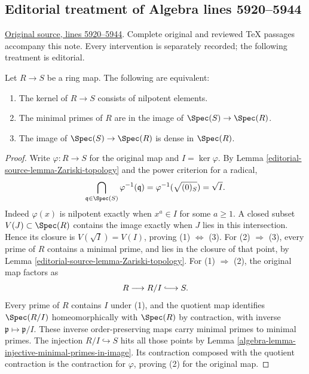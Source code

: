 \subsection{Editorial treatment of Algebra lines 5920--5944}

\hypertarget{algebra-context-042}{}

\noindent\href{https://github.com/stacks/stacks-project/blob/a04446e57ec1fbc252a871afcec7752fb2807b14/algebra.tex\#L5920}{Original source, lines 5920--5944}. Complete original and reviewed TeX passages accompany this note. Every intervention is separately recorded; the following treatment is editorial.


\begin{lemma}
\label{editorial-source-lemma-image-dense-generic-points}
Let $R \to S$ be a ring map. The following are equivalent:
\begin{enumerate}
\item The kernel of $R \to S$ consists of nilpotent elements.
\item The minimal primes of $R$ are in the image of
$\Spec(S) \to \Spec(R)$.
\item The image of $\Spec(S) \to \Spec(R)$ is dense
in $\Spec(R)$.
\end{enumerate}
\end{lemma}

\begin{proof}
Write $\varphi:R\to S$ for the original map and $I=\ker\varphi$.
By Lemma \ref{editorial-source-lemma-Zariski-topology} and the power criterion for a
radical,
$$
\bigcap_{\mathfrak q\in\Spec(S)}\varphi^{-1}(\mathfrak q)
=\varphi^{-1}(\sqrt{(0)_S})=\sqrt I.
$$
Indeed $\varphi(x)$ is nilpotent exactly when $x^a\in I$ for some
$a\geq1$. A closed subset $V(J)\subset\Spec(R)$ contains the image
exactly when $J$ lies in this intersection. Hence its closure is
$V(\sqrt I)=V(I)$, proving (1) $\Leftrightarrow$ (3).
For (2) $\Rightarrow$ (3), every prime of $R$ contains a minimal
prime, and lies in the closure of that point, by
Lemma \ref{editorial-source-lemma-Zariski-topology}.
For (1) $\Rightarrow$ (2), the original map factors as
$$
R\longrightarrow R/I\lhook\joinrel\longrightarrow S.
$$
Every prime of $R$ contains $I$ under (1), and the quotient map
identifies $\Spec(R/I)$ homeomorphically with $\Spec(R)$ by
contraction, with inverse $\mathfrak p\mapsto\mathfrak p/I$.
These inverse order-preserving maps carry minimal primes to minimal
primes. The injection $R/I\hookrightarrow S$ hits all those points
by Lemma \ref{algebra-lemma-injective-minimal-primes-in-image}. Its contraction
composed with the quotient contraction is the contraction for
$\varphi$, proving (2) for the original map.
\end{proof}


